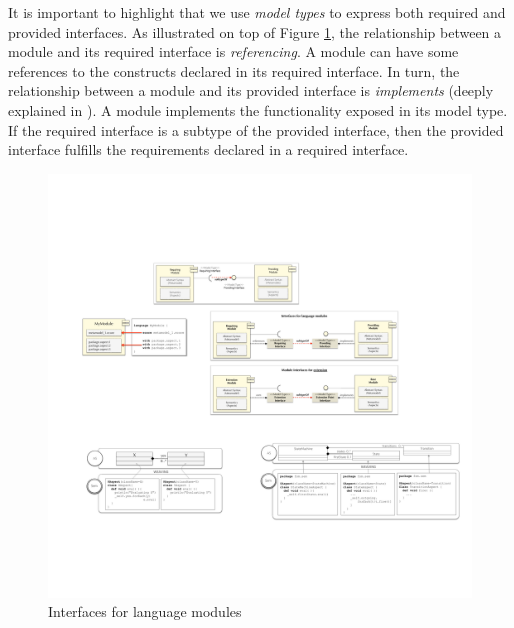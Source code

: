 It is important to highlight that we use \textit{model types} \cite{Steel:2007} to express both required and provided interfaces. As illustrated on top of Figure \ref{fig:approaches-interfaces}, the relationship between a module and its required interface is \textit{referencing}. A module can have some references to the constructs declared in its required interface. In turn, the relationship between a module and its provided interface is \textit{implements} (deeply explained in \cite{Degueule:2015}). A module implements the functionality exposed in its model type. If the required interface is a subtype of the provided interface, then the provided interface fulfills the requirements declared in a required interface. 

\begin{figure}
\centering
\includegraphics[width=1\linewidth]{images/approach-interfaces.pdf}
\caption{Interfaces for language modules}
\label{fig:approaches-interfaces}
\end{figure}

\vspace{-3mm}

